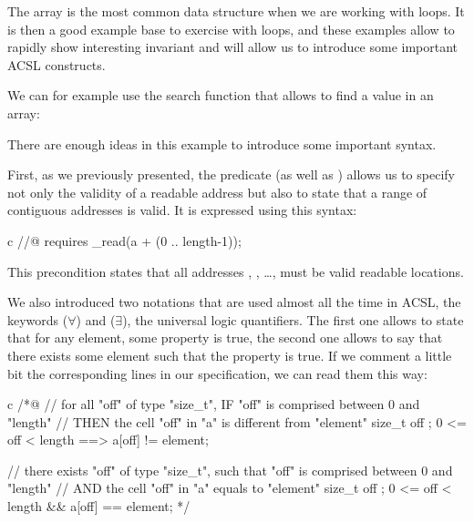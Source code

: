 \label{l3:statements-loops-examples-ro}


The array is the most common data structure when we are working with loops.
It is then a good example base to exercise with loops, and these
examples allow to rapidly show interesting invariant and will allow us
to introduce some important ACSL constructs.



We can for example use the search function that allows to find a value
in an array:





There are enough ideas in this example to introduce some important syntax.



First, as we previously presented, the
 predicate (as well as
) allows us to specify not only the
validity of a readable address but also to state that a range of
contiguous addresses is valid. It is expressed using this syntax:



\begin{CodeBlock}{c}
//@ requires \valid_read(a + (0 .. length-1));
\end{CodeBlock}



This precondition states that all addresses ,
, \ldots{},  must be valid readable
locations.



We also introduced two notations that are used almost all the time in
ACSL, the keywords  ($\forall$) and
 ($\exists$), the universal logic
quantifiers. The first one allows to state that for any element, some
property is true, the second one allows to say that there exists some
element such that the property is true. If we comment a little bit the
corresponding lines in our specification, we can read them this way:


\begin{CodeBlock}{c}
/*@
// for all "off" of type "size_t", IF "off" is comprised between 0 and "length"
//                                 THEN the cell "off" in "a" is different from "element"
\forall size_t off ; 0 <= off < length ==> a[off] != element;

// there exists "off" of type "size_t", such that "off" is comprised between 0 and "length"
//                                      AND the cell "off" in "a" equals to "element"
\exists size_t off ; 0 <= off < length && a[off] == element;
*/
\end{CodeBlock}



